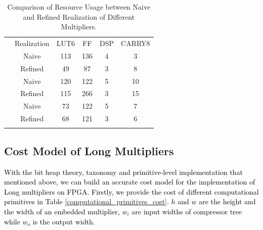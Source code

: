 \documentclass[conference]{IEEEtran}
\begin{document}
\begin{table}[ht]
    \centering
    \caption{Comparison of Resource Usage between Naive and Refined Realization of Different Multipliers.}
    \renewcommand{\arraystretch}{1.1}
    \begin{tabular}{l|c|c|c|c|c}
        \Xhline{1.5pt}
                                      & Realization & LUT6 &  FF  & DSP & CARRY8 \\  
        \Xhline{1pt}
        \multirow{2}{*}{Karabase}     &    Naive    &  113 &  136 &  4  &   3    \\
        \cline{2-6}
                                      &   Refined   &  49  &  87  &  3  &   8    \\
        \Xhline{1pt}
        \multirow{2}{*}{Full-Mult}    &    Naive    &  120 &  122 &  5  &   10   \\
        \cline{2-6}
                                      &   Refined   &  115 &  266 &  3  &   15   \\
        \Xhline{1pt}
        \multirow{2}{*}{Square-Mult}  &    Naive    &  73  &  122 &  5  &   7    \\
        \cline{2-6}
                                      &   Refined   &  68  &  121 &  3  &   6    \\
        \Xhline{1.5pt}
    \end{tabular}
    \label{Naive_Refined}
\end{table}

\subsection{Cost Model of Long Multipliers}    %

\textcolor{black}{
With the bit heap theory, taxonomy and primitive-level implementation that mentioned above, we can build an accurate cost model for the implementation of Long multipliers on FPGA.
Firstly, we provide the cost of different computational primitives in Table  \ref{computational_primitives_cost}. $h$ and $w$ are the height and the width of an embedded multiplier, $w_i$ are input widths of compressor tree while $w_o$ is the output width.
}
\end{document}
